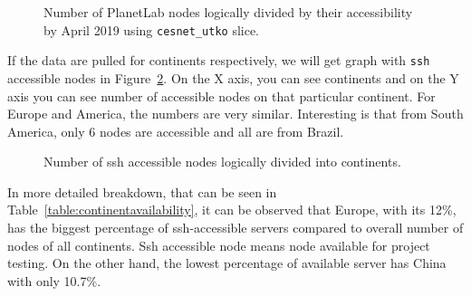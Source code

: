 {{{{{{{\begin{figure}[H]
	\centering
	\caption{Number of PlanetLab nodes logically divided by their accessibility by April 2019 using \texttt{cesnet\_utko} slice.}
	\label{fig:nodestats}
\end{figure}

If the data are pulled for continents respectively, we will get graph with \texttt{ssh} accessible nodes in Figure~\ref{fig:sshcountriesgraph}. On the X axis, you can see continents and on the Y axis you can see number of accessible nodes on that particular continent. For Europe and America, the numbers are very similar. Interesting is that from South America, only 6 nodes are accessible and all are from Brazil.

\begin{figure}[H]
	\centering
	\caption{Number of ssh accessible nodes logically divided into continents.}
	\label{fig:sshcountriesgraph}
\end{figure}

In more detailed breakdown, that can be seen in  Table~\ref{table:continentavailability}, it can be observed that Europe, with its 12\%, has the biggest percentage of ssh-accessible servers compared to overall number of nodes of all continents. Ssh accessible node means node available for project testing. On the other hand, the lowest percentage of available server has China with only 10.7\%.

}}}}}}}
